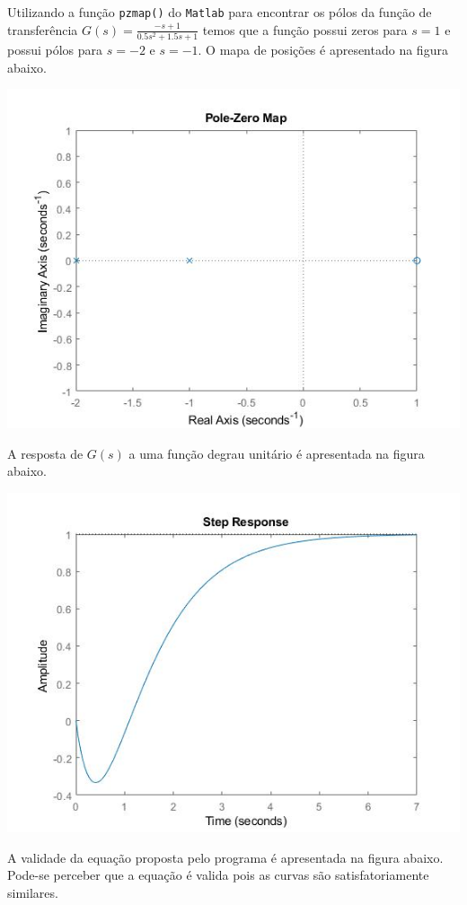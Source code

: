 \documentclass[
]{book}
\theoremstyle{definition}
\theoremstyle{definition}
\theoremstyle{definition}
\theoremstyle{remark}
\begin{document}
Utilizando a função \texttt{pzmap()} do \texttt{Matlab} para encontrar os pólos da função de transferência \(G(s) = \frac {-s +1}{0.5s^2+1.5s+1}\) temos que a função possui zeros para \(s=1\) e possui pólos para \(s = -2\) e \(s = -1\). O mapa de posições é apresentado na figura abaixo.

\includegraphics{Imagens/Lab2/prob6A.jpg}

A resposta de \(G(s)\) a uma função degrau unitário é apresentada na figura abaixo.

\includegraphics{Imagens/Lab2/prob6B.jpg}

A validade da equação proposta pelo programa é apresentada na figura abaixo. Pode-se perceber que a equação é valida pois as curvas são satisfatoriamente similares.
\end{document}
